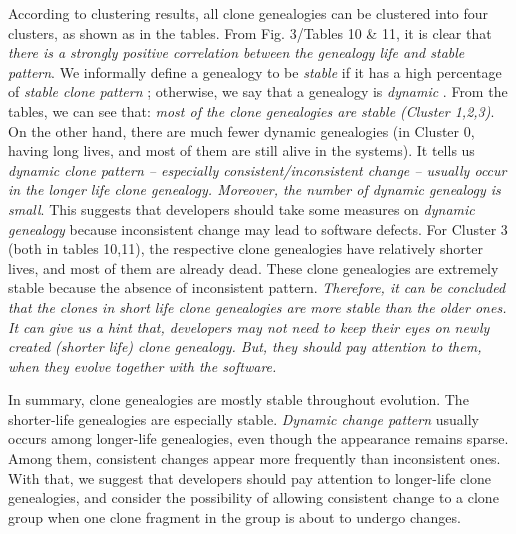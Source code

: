 According to clustering results, all clone genealogies can be clustered into four clusters, as shown as in the tables. From Fig. 3/Tables 10 \& 11, it is clear that {\em there is a strongly positive correlation between the genealogy life and stable pattern}. We informally define a genealogy to be {\em stable} if it has a high percentage of {\em stable clone pattern}%
; otherwise, we say that a genealogy is {\em dynamic}%
. From the tables, we can see that: {\em most of the clone genealogies are stable (Cluster 1,2,3)}. On the other hand, there are much fewer dynamic genealogies (in Cluster 0, having long lives, and most of them are still alive in the systems). It tells us {\em dynamic clone pattern -- especially consistent/inconsistent change -- usually occur in the longer life clone genealogy. Moreover, the number of dynamic genealogy is small}. This suggests that developers should take some measures on {\em dynamic genealogy} because inconsistent change may lead to software defects. For Cluster 3 (both in tables 10,11), the respective clone genealogies have relatively shorter lives, and most of them are already dead. These clone genealogies are extremely stable because the absence of inconsistent pattern. {\em Therefore, it can be concluded that the clones in short life clone genealogies are more stable than the older ones. It can give us a hint that, developers may not need to keep their eyes on newly created (shorter life) clone genealogy. But, they should pay attention to them, when they evolve together with the software.}

In summary, clone genealogies are mostly stable throughout evolution. The shorter-life genealogies are especially stable. {\em Dynamic change pattern} usually occurs among longer-life genealogies, even though the appearance remains sparse. Among them, consistent changes appear more frequently than inconsistent ones. With that, we suggest that developers should pay attention to longer-life clone genealogies, and consider the possibility of allowing consistent change to a clone group when one clone fragment in the group is about to undergo changes.
